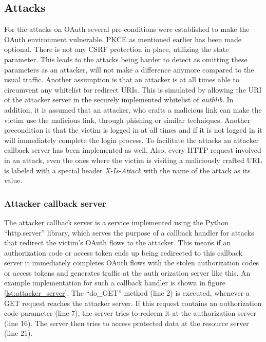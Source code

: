 \documentclass[
    fontsize=12pt,
    headings=small,
    parskip=half,           %
    bibliography=totoc,
    numbers=noenddot,       %
    open=any,               %
    ]{scrreprt}
\begin{document}
\subsection{Attacks}
\label{subsec:attacks}
For the attacks on OAuth several pre-conditions were established to make the OAuth environment vulnerable. PKCE as mentioned earlier has been made optional. There is not any CSRF protection in place, utilizing the state parameter. This leads to the attacks being harder to detect as omitting these parameters as an attacker, will not make a difference anymore compared to the usual traffic. Another assumption is that an attacker is at all times able to circumvent any whitelist for redirect URIs. This is simulated by allowing the URI of the attacker server in the securely implemented whitelist of \emph{authlib}. In addition, it is assumed that an attacker, who crafts a malicious link can make the victim use the malicious link, through phishing or similar techniques. Another precondition is that the victim is logged in at all times and if it is not logged in it will immediately complete the login process. To facilitate the attacks an attacker callback server has been implemented as well. Also, every HTTP request involved in an attack, even the ones where the victim is visiting a maliciously crafted URL is labeled with a special header \emph{X-Is-Attack} with the name of the attack as its value.

\subsubsection{Attacker callback server}
The attacker callback server is a service implemented using the Python ``http.server'' library, which serves the purpose of a callback handler for attacks that redirect the victim's OAuth flows to the attacker. This means if an authorization code or access token ends up being redirected to this callback server it immediately completes OAuth flows with the stolen authorization codes or access tokens and generates traffic at the auth orization server like this. An example implementation for such a callback handler is shown in figure \ref{lst:attacker_server}. The ``do\_GET'' method (line 2) is executed, whenever a GET request reaches the attacker server. If this request contains an authorization code parameter (line 7), the server tries to redeem it at the authorization server (line 16). The server then tries to access protected data at the resource server (line 21).
\end{document}

